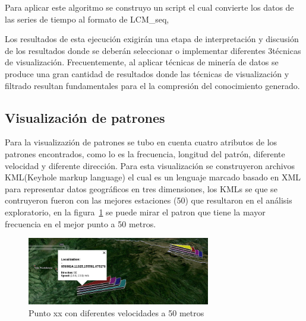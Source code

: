 Para aplicar este algoritmo se construyo un script el cual convierte los datos de las series de tiempo al
formato de LCM\_seq,  


Los resultados de esta ejecución exigirán una etapa de interpretación y discusión
 de los resultados donde se deberán seleccionar o implementar diferentes
3técnicas de visualización. Frecuentemente, al aplicar técnicas de minería de datos
se produce una gran cantidad de resultados donde las técnicas de visualización y
filtrado resultan fundamentales para el la compresión del conocimiento generado.

\subsection{Visualización de patrones}

Para la visualizazión de patrones se tubo en cuenta cuatro atributos de los patrones encontrados, como lo es
la frecuencia, longitud del patrón, diferente velocidad y diferente dirección. Para esta visualización se
construyeron archivos KML(Keyhole markup language) el cual es un lenguaje marcado basado en XML para representar
datos geográficos en tres dimensiones, los KMLs se que se contruyeron fueron con las mejores estaciones (50) que resultaron
en el análisis exploratorio, en la figura~\ref{fig:speedpattern} se puede mirar el patron que tiene la mayor frecuencia en el
mejor punto a 50 metros.

\begin{figure}
  \centering
  \includegraphics[width = 8cm]{speedpattern.png}
  \caption{Punto xx con diferentes velocidades a 50 metros}
  \label{fig:speedpattern}
\end{figure}





